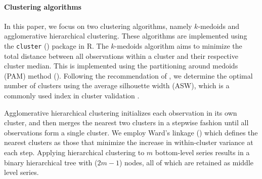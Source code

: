 \documentclass[a4paper,review,12pt,authoryear]{elsarticle}
\begin{document}
\paragraph{\textbf{Clustering algorithms}}
In this paper, we focus on two clustering algorithms, namely $k$-medoids and agglomerative hierarchical clustering. These algorithms are implemented using the \texttt{cluster} (\citealp{cluster}) package in R. {The $k$-medoids algorithm aims to minimize the total distance between all observations within a cluster and their respective cluster median.} This is implemented using the partitioning around medoids (PAM) method (\citealp{PartitioningMedoidsProgram1990}).
Following the recommendation of \cite{PartitioningMedoidsProgram1990}, we determine the optimal number of clusters using the average silhouette width (ASW), which is a commonly used index in cluster validation \citep[see \textit{e.g.},][]{shutaywi2021silhouette}.

Agglomerative hierarchical clustering initializes each observation in its own cluster, and then merges the nearest two clusters in a stepwise fashion until all observations form a single cluster. We employ Ward's linkage (\citealp{murtaghWardHierarchicalAgglomerative2014a}) which defines the nearest clusters as those that minimize the increase in within-cluster variance at each step. Applying hierarchical clustering to $m$ bottom-level series results in a binary hierarchical tree with ($2m-1$) nodes, all of which are retained as middle level series. 
\end{document}
